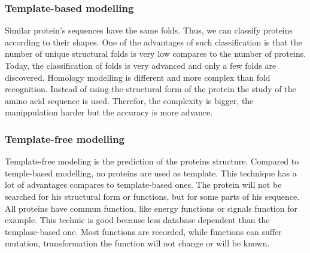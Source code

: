 \subsubsection{Template-based modelling}
Similar protein's sequences have the same folds. Thus, we can classify proteins according to their shapes. One of the advantages of such classification is that the number of unique structural folds is very low compares to the number of proteins.
\newline
Today, the classification of folds is very advanced and only a few folds are discovered.
Homology modelling is different and more complex than fold recognition. Instead of using the structural form of the protein the study of the amino acid sequence is used. Therefor, the complexity is bigger, the manippulation harder but the accuracy is more advance.

\subsubsection{Template-free modelling}
Template-free modeling is the prediction of the proteins structure. Compared to temple-based modelling, no proteins are used as template. 
\newline This technique has a lot of advantages compares to template-based ones. The protein will not be searched for his structural form or functions, but for some parts of his sequence. All proteins have commun function,  like energy functions or signals function for example. This technic is good because less database dependent than the templase-based one. Most functions are recorded, while functions can suffer mutation, transformation the function will not change or will be known.